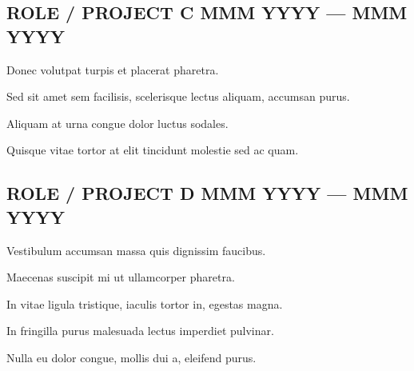 \subsection{{ROLE / PROJECT C \hfill MMM YYYY --- MMM YYYY}}
\begin{zitemize}
\item Donec volutpat turpis et placerat pharetra.
\item Sed sit amet sem facilisis, scelerisque lectus aliquam, accumsan purus.
\item Aliquam at urna congue dolor luctus sodales.
\item Quisque vitae tortor at elit tincidunt molestie sed ac quam.
\end{zitemize}

\subsection{{ROLE / PROJECT D \hfill MMM YYYY --- MMM YYYY}}
\begin{zitemize}
\item Vestibulum accumsan massa quis dignissim faucibus.
\item Maecenas suscipit mi ut ullamcorper pharetra.
\item In vitae ligula tristique, iaculis tortor in, egestas magna.
\item In fringilla purus malesuada lectus imperdiet pulvinar.
\item Nulla eu dolor congue, mollis dui a, eleifend purus.
\end{zitemize}

